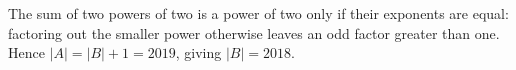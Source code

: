The sum of two powers of two is a power of two only if their exponents are equal: factoring out the smaller power otherwise leaves an odd factor greater than one. Hence $|A|=|B|+1=2019$, giving $\boxed{|B|=2018}$.
